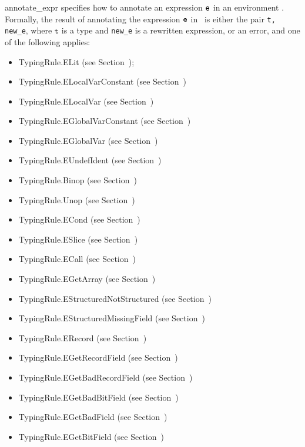 \documentclass{book}
\newcommand\vt[0]{\texttt{t}}
\begin{document}
\begin{itemize}
\textsf{annotate\_expr} specifies how to annotate an expression $\texttt{e}$ in
an environment \tenv.  Formally, the result of annotating the expression
$\texttt{e}$ in \tenv\ is either the pair \texttt{t, new\_e}, where $\vt$ is a type and
\texttt{new\_e} is a rewritten expression, or an error, and one of the following applies:
\begin{itemize}
\item TypingRule.ELit (see Section~);
\item TypingRule.ELocalVarConstant (see Section~)
\item TypingRule.ELocalVar (see Section~)
\item TypingRule.EGlobalVarConstant (see Section~)
\item TypingRule.EGlobalVar (see Section~)
\item TypingRule.EUndefIdent (see Section~)
\item TypingRule.Binop (see Section~)
\item TypingRule.Unop (see Section~)
\item TypingRule.ECond (see Section~)
\item TypingRule.ESlice (see Section~)
\item TypingRule.ECall (see Section~)
\item TypingRule.EGetArray (see Section~)
\item TypingRule.EStructuredNotStructured (see Section~)
\item TypingRule.EStructuredMissingField (see Section~)
\item TypingRule.ERecord (see Section~)
\item TypingRule.EGetRecordField (see Section~)
\item TypingRule.EGetBadRecordField (see Section~)
\item TypingRule.EGetBadBitField (see Section~)
\item TypingRule.EGetBadField (see Section~)
\item TypingRule.EGetBitField (see Section~)

\end{itemize}
\end{itemize}
\end{document}
